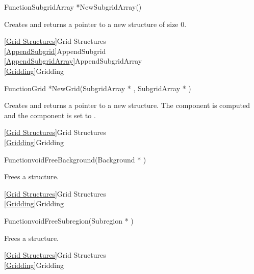 {\newpage\clearpage
{}%
\begin{deftypefn}{Function}{SubgridArray *}{NewSubgridArray}()
\par
\DESCRIPTION
Creates and returns a pointer to a new  structure
of size 0.
\par
\SEEALSO
\vref{Grid Structures}{Grid Structures}\\
\vref{AppendSubgrid}{AppendSubgrid}\\
\vref{AppendSubgridArray}{AppendSubgridArray}\\
\vref{Gridding}{Gridding}
\par
\end{deftypefn}%
\lthtmlfigureZ
\lthtmlcheckvsize\clearpage}

{\newpage\clearpage
{}%
\begin{deftypefn}{Function}{Grid *}{NewGrid}({SubgridArray *} , {SubgridArray *} )
\par
\DESCRIPTION
Creates and returns a pointer to a new  structure.
The  component is computed and the 
component is set to .
\par
\SEEALSO
\vref{Grid Structures}{Grid Structures}\\
\vref{Gridding}{Gridding}
\par
\end{deftypefn}%
\lthtmlfigureZ
\lthtmlcheckvsize\clearpage}

{\newpage\clearpage
{}%
\begin{deftypefn}{Function}{void}{FreeBackground}({Background *} )
\par
\DESCRIPTION
Frees a  structure.
\par
\SEEALSO
\vref{Grid Structures}{Grid Structures}\\
\vref{Gridding}{Gridding}
\par
\end{deftypefn}%
\lthtmlfigureZ
\lthtmlcheckvsize\clearpage}

{\newpage\clearpage
{}%
\begin{deftypefn}{Function}{void}{FreeSubregion}({Subregion *} )
\par
\DESCRIPTION
Frees a  structure.
\par
\SEEALSO
\vref{Grid Structures}{Grid Structures}\\
\vref{Gridding}{Gridding}
\par
\end{deftypefn}%
\lthtmlfigureZ
\lthtmlcheckvsize\clearpage}

